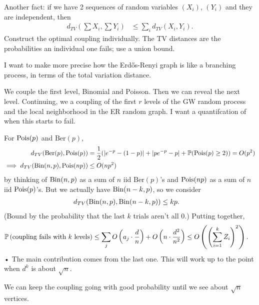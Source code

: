 Another fact: if we have 2 sequences of random variables $(X_i)$, $(Y_i)$ and they are independent, then 
\begin{align}
d_{TV}(\sum X_i, \sum Y_i) &\le \sum_i d_{TV}(X_i,Y_i).
\end{align}
Construct the optimal coupling individually. The TV distances are the probabilities an individual one fails; use a union bound.

I want to make more precise how the Erd\H os-Renyi graph is like a branching process, in terms of the total variation distance.

We couple the first level, Binomial and Poisson. Then we can reveal the next level.
Continuing, we a coupling of the first $r$ levels of the GW random process and the local neighborhood in the ER random graph. I want a quantifcation of when this starts to fail.

For $\operatorname{Pois}(p)$ and $\text{Ber}(p)$,
\begin{align}
d_{TV} (\text{Ber}(p), \operatorname{Pois}(p))
&= \frac{1}{2} (|e^{-p}-(1-p)| + |pe^{-p}-p| + \mathbb{P}(\text{Pois}(p)\ge 2))=O(p^2)\\
\implies 
d_{TV}(\operatorname{Bin}(n,p), \operatorname{Pois}(np)) &\le O(np^2)
\end{align}
by thinking of $\operatorname{Bin}(n,p)$ as a sum of $n$ iid $\text{Ber}(p)$'s and $\operatorname{Pois}(np)$ as a sum of $n$ iid $\operatorname{Pois}(p)$'s. But we actually have $\operatorname{Bin}(n-k,p)$, so we consider
\begin{align}
d_{TV}(\operatorname{Bin}(n,p), \operatorname{Bin}(n-k,p))&\le kp.
\end{align}
(Bound by the probability that the last $k$ trials aren't all 0.)
Putting together, 
\begin{align}
\mathbb{P}\left( \text{coupling fails with $k$ levels} \right)
&\le \sum_j O\left( {a_j \cdot \frac{d}{n}} \right) + O\left( {n\cdot \frac{d^2}{n^2}} \right)
\le O\left( {\left( {\sum_{i=1}^{k} Z_i} \right)^2} \right).
\end{align}•
The main contribution comes from the last one.
This will work up to the point when $d^k$ is about $\sqrt n$.

We can keep the coupling going with good probability until we see about $\sqrt n$ vertices.


